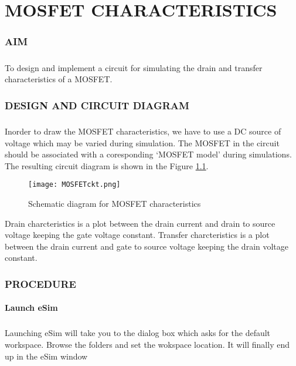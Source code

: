 \chapter{MOSFET CHARACTERISTICS}

\subsection*{AIM}
\paragraph{}To design and implement a circuit for simulating the drain and transfer characteristics of a MOSFET.

\subsection*{DESIGN AND CIRCUIT DIAGRAM}
\paragraph{}

Inorder to draw the MOSFET characteristics, we have to use a DC source of voltage which may be varied during simulation. The MOSFET in the circuit should be associated with a coresponding `MOSFET model' during  simulations. The resulting circuit diagram is shown in the Figure \ref{MOSFETckt}.
\begin{figure}[h]
\centering
\texttt{[image: MOSFETckt.png]}
\caption{Schematic diagram for MOSFET characteristics}
\label{MOSFETckt}
\end{figure}

Drain charcteristics is a plot between the drain current and drain to source voltage keeping the gate voltage constant. Transfer charcteristics is a plot between the drain current and gate to source voltage keeping the drain voltage constant.

\subsection*{PROCEDURE}

\subsubsection{Launch eSim}

\paragraph{}
 Launching eSim will take you to the dialog box which asks for the default workspace. Browse the folders and set the wokspace location. It will finally end up in the eSim window %

